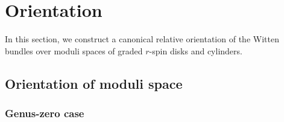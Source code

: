 \documentclass[11pt,a4paper]{article}
\theoremstyle{definition}
\theoremstyle{remark}
\numberwithin{equation}{section}
\begin{document}
\section{Orientation}\label{sec:orientation}
In this section, we construct a canonical relative orientation of the Witten bundles over moduli spaces of graded $r$-spin disks and cylinders. 

\subsection{Orientation of moduli space}
  
\subsubsection{Genus-zero case}
  
\end{document}
